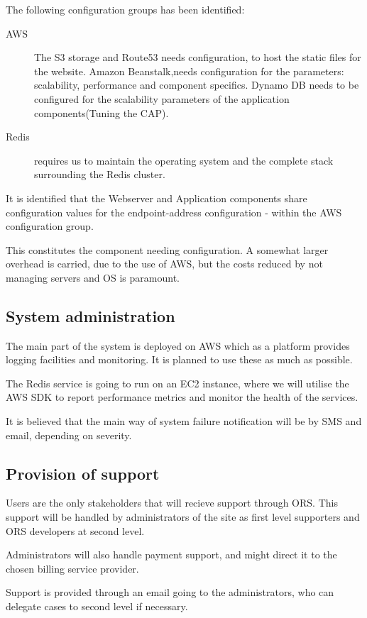 The following configuration groups has been identified:

\begin{description}
    \item[AWS] The S3 storage and Route53 needs configuration, to host
        the static files for the website.
        Amazon Beanstalk,needs configuration for the parameters:
        scalability, performance and component specifics.
        Dynamo DB needs to be configured for the scalability parameters of
        the application components(Tuning the CAP).
    \item[Redis] requires us to maintain the operating system and the complete
        stack surrounding the Redis cluster.
\end{description}

It is identified that the Webserver and Application components share
configuration values for the endpoint-address configuration - within the AWS
configuration group.

This constitutes the component needing configuration. A somewhat larger
overhead is carried, due to the use of AWS, but the costs reduced by not
managing servers and OS is paramount.


\subsection{System administration}
\label{sec:syst-admin}
The main part of the system is deployed on AWS which as a platform provides
logging facilities and monitoring. It is planned to use these as much as
possible.

The Redis service is going to run on an EC2 instance, where we will utilise the
AWS SDK to report performance metrics and monitor the health of the services.

It is believed that the main way of system failure notification will be by SMS
and email, depending on severity.


\subsection{Provision of support}
\label{sec:provision-support}
Users are the only stakeholders that will recieve support through ORS. This support will be handled by administrators of the site as first level supporters and ORS developers at second level.

Administrators will also handle payment support, and might direct it to the chosen billing service provider.

Support is provided through an email going to the administrators, who can delegate cases to second level if necessary.
